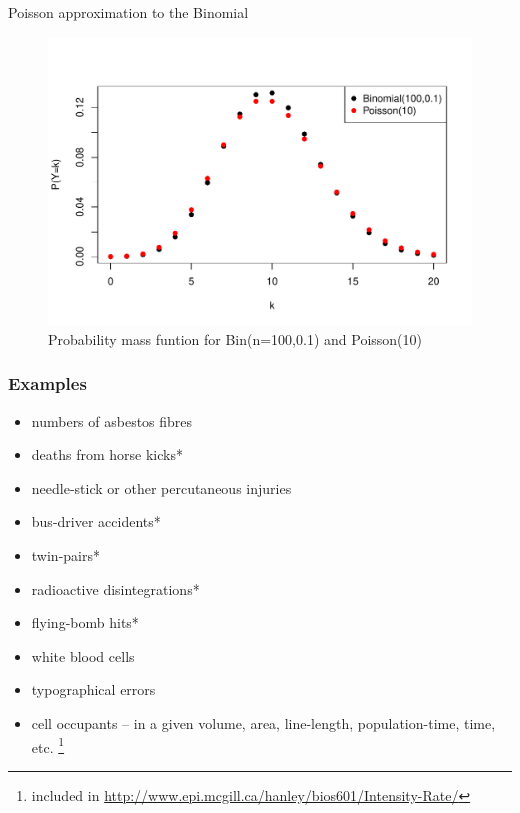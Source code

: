 \documentclass[10pt,handout]{beamer}\usepackage[]{graphicx}\usepackage[]{color}
\makeatletter
\def\maxwidth{ %
  \ifdim\Gin@nat@width>\linewidth
    \linewidth
  \else
    \Gin@nat@width
  \fi
}
\newenvironment{knitrout}{}{} %
\makeatother
\begin{document}
\begin{frame}{Poisson approximation to the Binomial}
	
	
\begin{knitrout}\tiny
{}\color{fgcolor}\begin{figure}

{\centering \includegraphics[width=\maxwidth]{figure/unnamed-chunk-13-1} 

}

\caption[Probability mass funtion for Bin(n=100,0.1) and Poisson(10)]{Probability mass funtion for Bin(n=100,0.1) and Poisson(10)}\label{fig:unnamed-chunk-13}
\end{figure}

\end{knitrout}
	
\end{frame}


\begin{frame}
	\frametitle{Examples}
	
	\begin{itemize}
		\setlength\itemsep{0.5em}
		\item numbers of asbestos fibres
		\item deaths from horse kicks*
		\item needle-stick or other percutaneous injuries
		\item bus-driver accidents*
		\item twin-pairs*
		\item radioactive disintegrations*
		\item flying-bomb hits*
		\item white blood cells
		\item typographical errors
		\item cell occupants -- in a given volume, area, line-length, population-time, time, etc. 
		\footnote{\footnotesize * included in \url{http://www.epi.mcgill.ca/hanley/bios601/Intensity-Rate/}}
	\end{itemize}
\end{frame}
\end{document}
